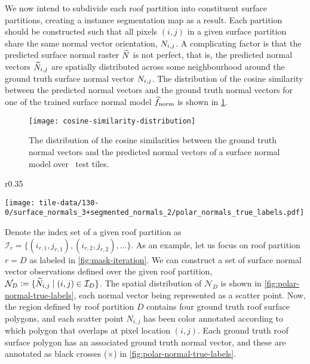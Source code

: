 We now intend to subdivide each roof partition into constituent surface partitions, creating a instance segmentation map as a result.
Each partition should be constructed such that all pixels $(i, j)$ in a given surface partition share the same normal vector orientation, $N_{i,j}$.
A complicating factor is that the predicted surface normal raster $\widetilde{N}$ is not perfect, that is, the predicted normal vectors $\widetilde{N}_{i,j}$ are spatially distributed across some neighbourhood around the ground truth surface normal vector $N_{i,j}$.
The distribution of the cosine similarity between the predicted normal vectors and the ground truth normal vectors for one of the trained surface normal model $\widehat{f}_{\mathrm{norm}}$ is shown in \cref{fig:cosine-similarity-distribution}.
\begin{figure}[H]
  \centering
  \texttt{[image: cosine-similarity-distribution]}
  \caption{%
    The distribution of the cosine similarities between the ground truth normal vectors and the predicted normal vectors of a surface normal model over \numtesttiles~test tiles.
  }%
  \label{fig:cosine-similarity-distribution}
\end{figure}
\begin{wrapfigure}{r}{0.35\textwidth}
  \begin{center}
    \texttt{[image: tile-data/130-0/surface\_normals\_3+segmented\_normals\_2/polar\_normals\_true\_labels.pdf]}
  \end{center}
  \caption{Ground truth labeling of predicted normal vectors.}%
  \label{fig:polar-normal-true-labels}
\end{wrapfigure}
\noindent
Denote the index set of a given roof partition as $\mathcal{I}_{r} = \{(i_{r,1}, j_{r,1}), (i_{r,2}, j_{r,2}), \ldots\}$.
As an example, let us focus on roof partition $r=D$ as labeled in \cref{fig:mask-iteration}.
We can construct a set of surface normal vector observations defined over the given roof partition, $\mathcal{N}_{D} \vcentcolon= \{\widetilde{N}_{i,j} \mid (i, j) \in \mathcal{I}_{D}\}$.
The spatial distribution of $\mathcal{N}_{D}$ is shown in \cref{fig:polar-normal-true-labels}, each normal vector being represented as a scatter point.
Now, the region defined by roof partition $D$ contains four ground truth roof surface polygons, and each scatter point $N_{i,j}$ has been color annotated according to which polygon that overlaps at pixel location $(i, j)$.
Each ground truth roof surface polygon has an associated ground truth normal vector, and these are annotated as black crosses ($\times$) in \cref{fig:polar-normal-true-labels}.
